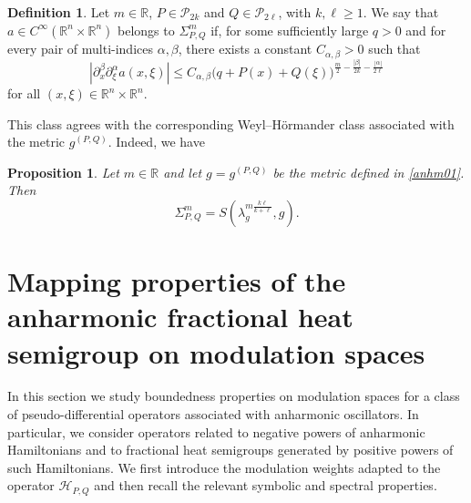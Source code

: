 \documentclass[12pt, reqno]{amsart}
\newtheorem{proposition}[theorem]{Proposition}
\theoremstyle{definition}
\newtheorem{definition}[theorem]{Definition}
\theoremstyle{remark}
\numberwithin{equation}{section}
\begin{document}
\begin{definition}
\label{DEF:sigmas}
Let $m\in\mathbb R$, $P\in\mathcal P_{2k}$ and $Q\in\mathcal P_{2\ell}$, with $k,\ell\geq1$. We say that $a\in C^\infty(\mathbb R^n\times\mathbb R^n)$
belongs to $\Sigma_{P,Q}^m$ if, for some sufficiently large $q>0$ and for every pair of multi-indices $\alpha,\beta$, there exists a constant $C_{\alpha,\beta}>0$ such that
\begin{equation}
\label{sigmacl}
    |\partial_x^\beta\partial_\xi^\alpha a(x,\xi)|
    \leq
    C_{\alpha,\beta}
    \big(q+P(x)+Q(\xi)\big)^{
    \frac m2-\frac{|\beta|}{2k}-\frac{|\alpha|}{2\ell}}
\end{equation}
for all $(x,\xi)\in\mathbb R^n\times\mathbb R^n$.
\end{definition}

This class agrees with the corresponding Weyl--H\"ormander class associated with the metric $g^{(P,Q)}$. Indeed, we have 

\begin{proposition}
\label{sht57}
Let $m\in\mathbb R$ and let $g=g^{(P,Q)}$ be the metric defined in \eqref{anhm01}. Then
\[
    \Sigma_{P,Q}^m
    =
    S\left(
    \lambda_g^{m\frac{k\ell}{k+\ell}},
    g
    \right).
\]
\end{proposition}


\section{Mapping properties of the anharmonic fractional heat semigroup on modulation spaces}
\label{Modul}

In this section we study boundedness properties on modulation spaces for a class of pseudo-differential operators associated with anharmonic oscillators. In particular, we consider operators related to negative powers of anharmonic Hamiltonians and to fractional heat semigroups generated by positive powers of such Hamiltonians. We first introduce the modulation weights adapted to the operator $\mathcal H_{P,Q}$ and then recall the relevant symbolic and spectral properties.
\end{document}
